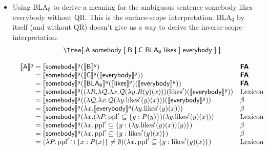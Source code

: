 \begin{itemize}
		\item Using \textsf{BLA}$_\emptyset$ to derive a meaning for the ambiguous sentence \textsf{somebody likes everybody} without QR. This is the surface-scope interpretation. \textsf{BLA}$_\emptyset$ by itself (and without QR) doesn't give us a way to derive the inverse-scope interpretation: %
		\[\begin{array}{c}
			\textsf{\Tree [.A somebody [.B [.C BLA$_\emptyset$ likes ] everybody ] ]}
			\\\\
			\begin{array}{r@{}ll}
				\sv{\textsf{A}}^g &{}= \sv{\textsf{somebody}}^g(\sv{\textsf{B}}^g) & \bsf{FA}%
				\\
				&{}= \sv{\textsf{somebody}}^g(\sv{\textsf{C}}^g(\sv{\textsf{everybody}}^g)) & \bsf{FA}%
				\\
				&{}= \sv{\textsf{somebody}}^g(\sv{\textsf{BLA}_\emptyset}^g(\sv{\textsf{likes}}^g)(\sv{\textsf{everybody}}^g)) & \bsf{FA}%
				\\
				&{}= \sv{\textsf{somebody}}^g((\lambda R.\lambda {\cal Q}.\lambda x.{\cal Q}(\lambda y.R(y)(x)))(\text{likes}')(\sv{\textsf{everybody}}^g)) & \text{Lexicon}%
				\\
				&{}= \sv{\textsf{somebody}}^g((\lambda {\cal Q}.\lambda x.{\cal Q}(\lambda y.\text{likes}'(y)(x)))(\sv{\textsf{everybody}}^g)) & \beta%
				\\
				&{}= \sv{\textsf{somebody}}^g(\lambda x.\sv{\textsf{everybody}}^g(\lambda y.\text{likes}'(y)(x))) & \beta%
				\\
				&{}= \sv{\textsf{somebody}}^g(\lambda x.(\lambda P.\,\text{ppl}' \subseteq \{y : P(y)\})(\lambda y.\text{likes}'(y)(x))) & \text{Lexicon}%
				\\
				&{}= \sv{\textsf{somebody}}^g(\lambda x.\,\text{ppl}' \subseteq \{y : (\lambda y.\text{likes}'(y)(x))(y)\}) & \beta%
				\\
				&{}= \sv{\textsf{somebody}}^g(\lambda x.\,\text{ppl}' \subseteq \{y : \text{likes}'(y)(x)\}) & \beta%
				\\
				&{}= (\lambda P.\,\text{ppl}' \cap \{x : P(x)\} \neq \emptyset)(\lambda x.\,\text{ppl}' \subseteq \{y : \text{likes}'(y)(x)\}) & \text{Lexicon}%

\end{array}
\end{array}\]
\end{itemize}
